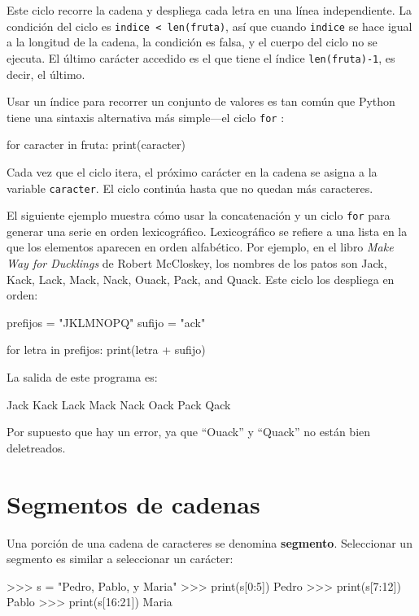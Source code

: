 Este ciclo recorre la cadena y despliega cada letra en una línea independiente.
La condición del ciclo es \texttt{indice < len(fruta)}, así que cuando
\texttt{indice} se hace igual a la longitud de la cadena, la condición
es falsa, y el cuerpo del ciclo no se ejecuta. El último carácter
accedido es el que tiene el índice \texttt{len(fruta)-1}, es decir,
el último.

Usar un índice para recorrer un conjunto de valores es tan común que
Python tiene una sintaxis alternativa más simple—el ciclo \texttt{for}
:

\begin{pythoncode}
for caracter in fruta:
   print(caracter)
\end{pythoncode}

Cada vez que el ciclo itera, el próximo carácter en la cadena se asigna
a la variable \texttt{caracter}. El ciclo continúa hasta que no quedan
más caracteres.

  

El siguiente ejemplo muestra cómo usar la concatenación y un ciclo
\texttt{for} para generar una serie en orden lexicográfico. Lexicográfico
se refiere a una lista en la que los elementos aparecen en orden alfabético.
Por ejemplo, en el libro {\em Make Way for Ducklings} de Robert
McCloskey, los nombres de los patos son Jack, Kack, Lack, Mack, Nack,
Ouack, Pack, and Quack. Este ciclo los despliega en orden:
\begin{pythoncode}
prefijos = "JKLMNOPQ"
sufijo = "ack"

for letra in prefijos:
  print(letra + sufijo)
\end{pythoncode}

La salida de este programa es:
\begin{pythoncode}
Jack
Kack
Lack
Mack
Nack
Oack
Pack
Qack
\end{pythoncode}

Por supuesto que hay un error, ya que ``Ouack'' y ``Quack'' no
están bien deletreados.

\section{Segmentos de cadenas }

\label{slice}  

Una porción de una cadena de caracteres se denomina \textbf{segmento}.
Seleccionar un segmento es similar a seleccionar un carácter:
\begin{pyconcode}
>>> s = "Pedro, Pablo, y Maria"
>>> print(s[0:5])
Pedro
>>> print(s[7:12])
Pablo
>>> print(s[16:21])
Maria
\end{pyconcode}

